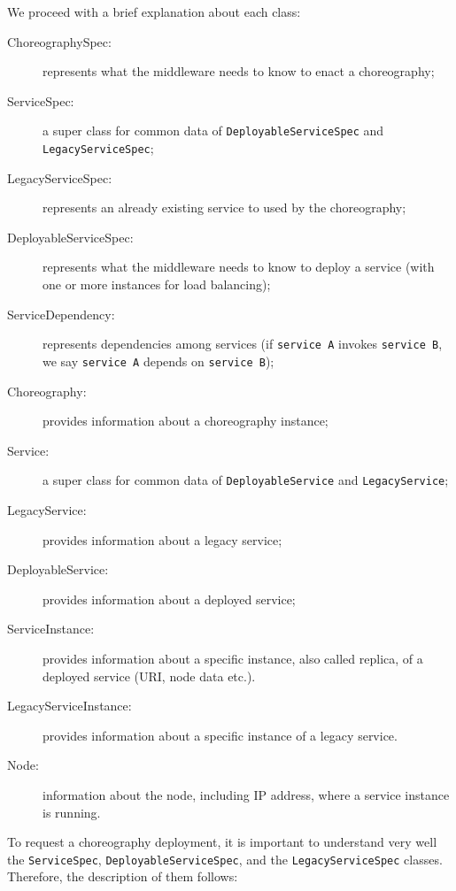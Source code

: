 We proceed with a brief explanation about each class:

\begin{description}
\item [ChoreographySpec:] represents what the middleware needs to know to enact a choreography;
\item [ServiceSpec:] a super class for common data of \verb!DeployableServiceSpec! and \verb!LegacyServiceSpec!;
\item [LegacyServiceSpec:] represents an already existing service to used by the choreography;
\item [DeployableServiceSpec:] represents what the middleware needs to know to deploy a service (with one or more instances for load balancing); 
\item [ServiceDependency:] represents dependencies among services (if \verb!service A! invokes \verb!service B!, we say \verb!service A! depends on \verb!service B!);
\item [Choreography:] provides information about a choreography instance;
\item [Service:] a super class for common data of \verb!DeployableService! and \verb!LegacyService!;
\item [LegacyService:] provides information about a legacy service;
\item [DeployableService:] provides information about a deployed service;
\item [ServiceInstance:] provides information about a specific instance, also called replica, of a deployed service (URI, node data etc.). 
\item [LegacyServiceInstance:] provides information about a specific instance of a legacy service. 
\item [Node:] information about the node, including IP address, where a service instance is running.
\end{description}

To request a choreography deployment, it is important to understand very well the \verb!ServiceSpec!, \verb!DeployableServiceSpec!, and the \verb!LegacyServiceSpec! classes. Therefore, the description of them follows:

